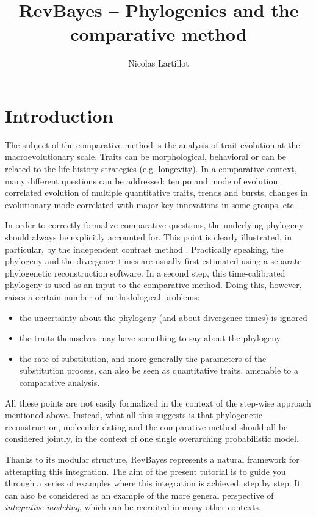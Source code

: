 \documentclass[usletter]{article}
\title{RevBayes -- Phylogenies and the comparative method}
\author{Nicolas Lartillot}
\begin{document}
\maketitle

\section*{Introduction}

The subject of the comparative method is the analysis of trait evolution at the macroevolutionary scale.
Traits can be morphological, behavioral or can be related to the life-history strategies (e.g. longevity).
In a comparative context, many different questions can be addressed: tempo and mode of evolution, correlated evolution of multiple quantitative traits, trends and bursts, changes in evolutionary mode correlated with major key innovations in some groups, etc \citep[see][for a good introduction]{Harvey:1991p899}.

In order to correctly formalize comparative questions, the underlying phylogeny should always be explicitly accounted for. This point is clearly illustrated, in particular, by the independent contrast method \citep{Felsenstein:1985p686}. Practically speaking, the phylogeny and the divergence times are usually first estimated using a separate phylogenetic reconstruction software. In a second step, this time-calibrated phylogeny is used as an input to the comparative method.
Doing this, however, raises a certain number of methodological problems:
\begin{itemize}
\item
the uncertainty about the phylogeny (and about divergence times) is ignored
\item
the traits themselves may have something to say about the phylogeny
\item
the rate of substitution, and more generally the parameters of the substitution process, can also be seen as quantitative traits, amenable to a comparative analysis.
\end{itemize}
All these points are not easily formalized in the context of the step-wise approach mentioned above.
Instead, what all this suggests is that phylogenetic reconstruction, molecular dating and the comparative method should all be considered jointly, in the context of one single overarching probabilistic model.

Thanks to its modular structure, RevBayes represents a natural framework for attempting this integration.
The aim of the present tutorial is to guide you through a series of examples where this integration is achieved, step by step.
It can also be considered as an example of the more general perspective of \emph{integrative modeling}, which can be recruited in many other contexts.
\end{document}

